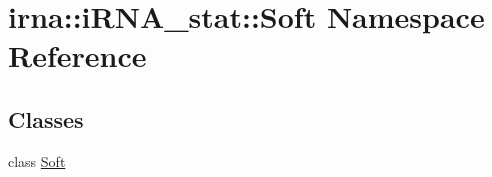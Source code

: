 \hypertarget{namespaceirna_1_1iRNA__stat_1_1Soft}{
\section{irna\-:\-:i\-R\-N\-A\-\_\-stat\-:\-:\-Soft \-Namespace \-Reference}
\label{namespaceirna_1_1iRNA__stat_1_1Soft}
}
\subsection*{\-Classes}
\begin{DoxyCompactItemize}
\item 
class \hyperlink{classirna_1_1iRNA__stat_1_1Soft_1_1Soft}{\-Soft}
\end{DoxyCompactItemize}
